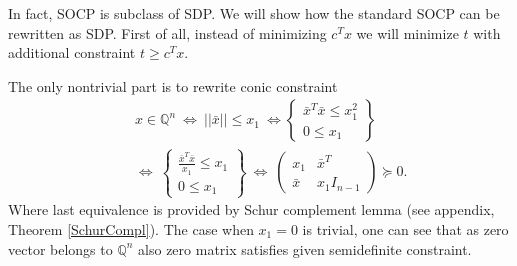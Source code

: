 \documentclass[12pt]{book}
\theoremstyle{definition}
\begin{document}
In fact, SOCP is subclass of SDP. We will show how the standard SOCP can be rewritten as SDP.
First of all, instead of minimizing $c^Tx$ we will minimize $t$ with additional constraint $t\geq c^Tx$. 

The only nontrivial part is to rewrite conic constraint 
\begin{eqnarray*}
& &x\in \mathbb{Q}^n \ \Leftrightarrow  \ ||\bar{x}||\leq x_1 \ \Leftrightarrow  
\left\lbrace \begin{array}{r}
\bar{x}^T\bar{x}\leq x_1^2\\
0\leq x_1 
\end{array}\right\rbrace \\
 & &\Leftrightarrow \ 
 \left\lbrace \begin{array}{r}
\frac{\bar{x}^T\bar{x}}{x_1}\leq x_1\\
0\leq x_1 
\end{array}\right\rbrace 
 \ \Leftrightarrow  \ 
 \left( \begin{array}{cc}
x_1 & \bar{x}^T\\
\bar{x} & x_1I_{n-1}
\end{array}\right)\succeq 0.
\label{arrowx}
\end{eqnarray*}
Where last equivalence is provided by Schur complement lemma (see appendix, Theorem \ref{SchurCompl}). The case when $x_1=0$ is trivial, one can see that as zero vector belongs to $\mathbb{Q}^n$ also zero matrix satisfies given semidefinite constraint. 
\end{document}

